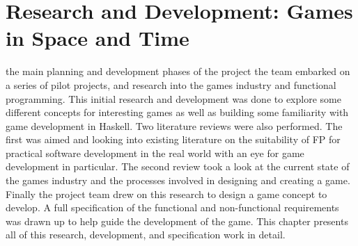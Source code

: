 \chapter[Research and Development: Games in Space and Time]{Research and Development: Games in Space and Time}
\label{ch:rd}


 the main planning and development phases of the project the team embarked on a series of pilot projects, and research into the games industry and functional programming. This initial research and development was done to explore some different concepts for interesting games as well as building some familiarity with game development in Haskell. Two literature reviews were also performed. The first was aimed and looking into existing literature on the suitability of FP for practical software development in the real world with an eye for game development in particular. The second review took a look at the current state of the games industry and the processes involved in designing and creating a game. Finally the project team drew on this research to design a game concept to develop. A full specification of the functional and non-functional requirements was drawn up to help guide the development of the game. This chapter presents all of this research, development, and specification work in detail.


\clearpage
\clearpage
\clearpage
